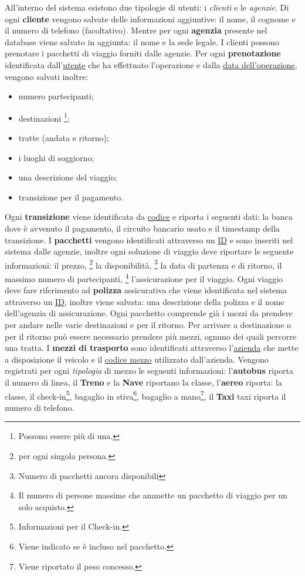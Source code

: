 %
%
All'interno del sistema esistono due tipologie di utenti: i \emph{clienti} e le \emph{agenzie}. Di ogni \textbf{cliente} vengono salvate delle informazioni aggiuntive: il nome, il cognome e il numero di telefono (facoltativo). Mentre per ogni \textbf{agenzia} presente nel database viene salvato in aggiunta: il nome e la sede legale.
%
%
I clienti possono prenotare i pacchetti di viaggio forniti dalle agenzie. Per ogni \textbf{prenotazione} identificata dall'\underline{utente} che ha effettuato l'operazione e dalla \underline{data dell'operazione}, vengono salvati inoltre:
\begin{multicols}{2}
\begin{itemize}
    \item numero partecipanti;
    \item destinazioni \footnote{Possono essere più di una.};
    \item tratte (andata e ritorno);
    \item i luoghi di soggiorno;
    \item una descrizione del viaggio;
    \item transizione per il pagamento.
\end{itemize}
\end{multicols}
%
%
Ogni \textbf{transizione} viene identificata da \underline{codice} e riporta i seguenti dati: la banca dove è avvenuto il pagamento, il circuito bancario usato e il timestamp della transizione.
%
%
I \textbf{pacchetti} vengono identificati attraverso un \underline{ID} e sono inseriti nel sistema dalle agenzie, inoltre ogni soluzione di viaggio deve riportare le seguente informazioni:
il prezzo,
\footnote{per ogni singola persona.}
la disponibilità, \footnote{Numero di pacchetti ancora disponibili}
la data di partenza e di ritorno,
il massimo numero di partecipanti,
\footnote{Il numero di persone massime che ammette un pacchetto di viaggio per un solo acquisto.}
l'assicurazione per il viaggio.
Ogni viaggio deve fare riferimento ad \textbf{polizza} assicurativa che viene identificata nel sistema attraverso un \underline{ID}, inoltre viene salvata: una descrizione della polizza e il nome dell'agenzia di assicurazione.
%
%
Ogni pacchetto comprende già i mezzi da prendere per andare nelle varie destinazioni e per il ritorno. Per arrivare a destinazione o per il ritorno può essere necessario prendere più mezzi, ognuno dei quali percorre una tratta. I \textbf{mezzi di trasporto} sono identificati attraverso l'\underline{azienda} che mette a disposizione il veicolo e il \underline{codice mezzo} utilizzato dall'azienda. Vengono registrati per ogni \emph{tipologia} di mezzo le seguenti informazioni:
l'\textbf{autobus} riporta il numero di linea,
il \textbf{Treno} e la \textbf{Nave} riportano la classe,
l'\textbf{aereo} riporta:
la classe,
il check-in\footnote{Informazioni per il Check-in.},
bagaglio in stiva\footnote{Viene indicato se è incluso nel pacchetto.},
bagaglio a mano\footnote{Viene riportato il peso concesso.},
%
il \textbf{Taxi} taxi riporta il numero di telefono.


